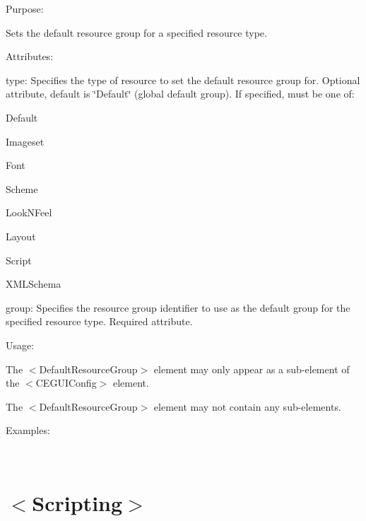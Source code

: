 \begin{DoxyItemize}
\item Purpose\+:
\begin{DoxyItemize}
\item Sets the default resource group for a specified resource type.
\end{DoxyItemize}
\item Attributes\+:
\begin{DoxyItemize}
\item {\ttfamily type\+:} Specifies the type of resource to set the default resource group for. Optional attribute, default is \char`\"{}\+Default\char`\"{} (global default group). If specified, must be one of\+:
\begin{DoxyItemize}
\item {\ttfamily Default} 
\item {\ttfamily Imageset} 
\item {\ttfamily Font} 
\item {\ttfamily Scheme} 
\item {\ttfamily Look\+N\+Feel} 
\item {\ttfamily Layout} 
\item {\ttfamily Script} 
\item {\ttfamily X\+M\+L\+Schema} 
\end{DoxyItemize}
\item {\ttfamily group\+:} Specifies the resource group identifier to use as the default group for the specified resource type. Required attribute.
\end{DoxyItemize}
\item Usage\+:
\begin{DoxyItemize}
\item The $<$Default\+Resource\+Group$>$ element may only appear as a sub-\/element of the $<$C\+E\+G\+U\+I\+Config$>$ element.
\item The $<$Default\+Resource\+Group$>$ element may not contain any sub-\/elements.
\end{DoxyItemize}
\item Examples\+:
\end{DoxyItemize}

~\newline
 \hypertarget{xml_config_xml_config_scripting}{}\section{$<$\+Scripting$>$}\label{xml_config_xml_config_scripting}

